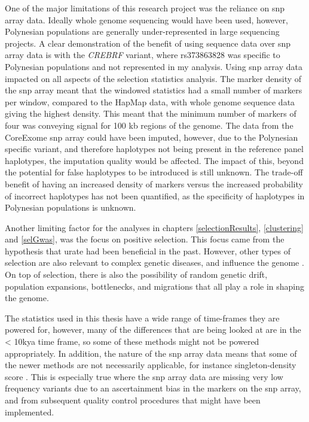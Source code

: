 \documentclass[twoside,openright]{report}
\begin{document}
One of the major limitations of this research project was the reliance
on \gls{snp} array data. Ideally whole genome sequencing would have been
used, however, Polynesian populations are generally under-represented in
large sequencing projects. A clear demonstration of the benefit of using
sequence data over \gls{snp} array data is with the \emph{CREBRF}
variant, where rs373863828 was specific to Polynesian populations
\citep{Minster2016, Krishnan2018} and not represented in my analysis.
Using \gls{snp} array data impacted on all aspects of the selection
statistics analysis. The marker density of the \gls{snp} array meant
that the windowed statistics had a small number of markers per window,
compared to the HapMap data, with whole genome sequence data giving the
highest density. This meant that the minimum number of markers of four
was conveying signal for 100 kb regions of the genome. The data from the
CoreExome \gls{snp} array could have been imputed, however, due to the
Polynesian specific variant, and therefore haplotypes not being present
in the reference panel haplotypes, the imputation quality would be
affected. The impact of this, beyond the potential for false haplotypes
to be introduced is still unknown. The trade-off benefit of having an
increased density of markers versus the increased probability of
incorrect haplotypes has not been quantified, as the specificity of
haplotypes in Polynesian populations is unknown.

Another limiting factor for the analyses in chapters
\ref{selectionResults}, \ref{clustering} and \ref{selGwas}, was the
focus on positive selection. This focus came from the hypothesis that
urate had been beneficial in the past. However, other types of selection
are also relevant to complex genetic diseases, and influence the genome
\citep{Andres2009a, Daub2013}. On top of selection, there is also the
possibility of random genetic drift, population expansions, bottlenecks,
and migrations that all play a role in shaping the genome.

The statistics used in this thesis have a wide range of time-frames they
are powered for, however, many of the differences that are being looked
at are in the \textless{} 10k\gls{ya} time frame, so some of these
methods might not be powered appropriately. In addition, the nature of
the \gls{snp} array data means that some of the newer methods are not
necessarily applicable, for instance singleton-density score
\citep{Field2016}. This is especially true where the \gls{snp} array
data are missing very low frequency variants due to an ascertainment
bias in the markers on the \gls{snp} array, and from subsequent quality
control procedures that might have been implemented.
\end{document}
